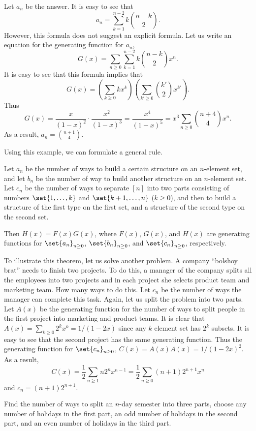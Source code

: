 Let $a_n$ be the answer. It is easy to see that
\[
  a_n = \sum_{k = 1}^{n - 2} k \binom{n - k}{2}.
\]
However, this formula does not suggest an explicit formula.
Let us write an equation for the generating function for $a_n$,
\[
  G(x) = \sum_{n \ge 0} \sum_{k = 1}^{n - 2} k \binom{n - k}{2} x^n.
\]
It is easy to see that this formula implies that
\[
  G(x) = \left( \sum_{k \ge 0} k x^k \right)
    \left( \sum_{k' \ge 0} \binom{k'}{2} x^{k'} \right).
\]
Thus
\[
  G(x) = \frac{x}{(1 - x)^2} \cdot \frac{x^2}{(1 - x)^3} =
  \frac{x^4}{(1 - x)^5} = x^3\sum_{n \ge 0} \binom{n + 4}{4} x^n.
\]
As a result, $a_n = \binom{n + 1}{4}$.

Using this example, we can formulate a general rule.
\begin{theorem}
  Let $a_n$ be the number of ways to build a certain structure on an $n$-element
  set, and let $b_n$ be the number of way to build another structure on an
  $n$-element set. Let $c_n$ be the number of ways to separate $[n]$ into two
  parts consisting of numbers $\set{1, \dots, k}$ and $\set{k + 1, \dots, n}$
  ($k \ge 0$), and then to build a structure of the first type on the first set,
  and a structure of the second type on the second set.

  Then $H(x) = F(x)G(x)$, where $F(x)$, $G(x)$, and $H(x)$ are generating
  functions for $\set{a_n}_{n \ge 0}$, $\set{b_n}_{n \ge 0}$, and
  $\set{c_n}_{n \ge 0}$, respectively.
\end{theorem}

To illustrate this theorem, let us solve another problem. A company
``bolshoy brat'' needs to finish two projects. To do this, a manager of the
company splits all the employees into two projects and in each project she selects
product team and marketing team. How many ways to do this.
Let $c_n$ be the number of ways the manager can complete this task. Again, let
us split the problem into two parts. Let $A(x)$ be the generating function for
the number of ways to split people in the first project into marketing and
product teams. It is clear that $A(x) = \sum_{k \ge 0} 2^k x^k = 1 / (1 - 2x)$
since any $k$ element set has $2^k$ subsets. It is easy to see that the second
project has the same generating function. Thus the generating function for
$\set{c_n}_{n \ge 0}$, $C(x) = A(x) A(x) = 1 / (1 - 2x)^2$.
As a result,
\[
  C(x) = \frac{1}{2} \sum_{n \ge 1} n 2^n x^{n - 1} =
  \frac{1}{2} \sum_{n \ge 0} (n + 1) 2^{n + 1} x^n
\]
and $c_n = (n + 1) 2^{n + 1}$.

\begin{exercise}
  Find the number of ways to split an $n$-day semester into three parts, choose
  any number of holidays in the first part, an odd number of holidays in the
  second part, and an even number of holidays in the third part.
\end{exercise}

